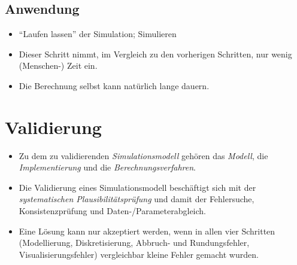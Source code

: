 	\section{Anwendung} %
		\label{sec:simanwendung}

		\begin{itemize}
			\item \enquote{Laufen lassen} der Simulation; Simulieren
			\item Dieser Schritt nimmt, im Vergleich zu den vorherigen Schritten, nur wenig (Menschen-) Zeit ein.
			\item Die Berechnung selbst kann natürlich lange dauern.
		\end{itemize}


\chapter{Validierung} %
	\label{c:simvalidierung}

	\begin{itemize}
		\item Zu dem zu validierenden \textit{Simulationsmodell} gehören das \textit{Modell}, die \textit{Implementierung} und die \textit{Berechnungsverfahren}.
		\item Die Validierung eines Simulationsmodell beschäftigt sich mit der \textit{systematischen Plausibilitätsprüfung} und damit der Fehlersuche, Konsistenzprüfung und Daten-/Parameterabgleich.
		\item Eine Lösung kann nur akzeptiert werden, wenn in allen vier Schritten (Modellierung, Diskretisierung, Abbruch- und Rundungsfehler, Visualisierungsfehler) vergleichbar kleine Fehler gemacht wurden.
	\end{itemize}


